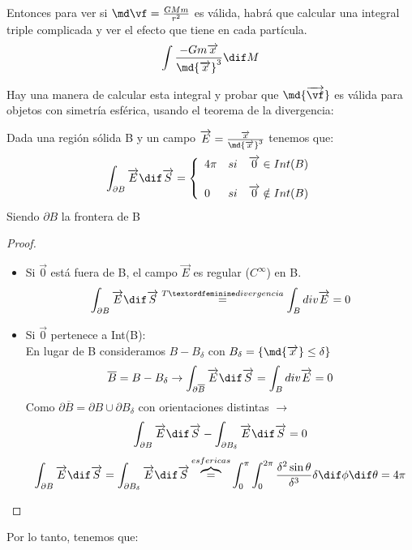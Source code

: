 Entonces para ver si $\md\vf = \frac{GMm}{r^2}$  es válida, habrá que calcular una integral triple complicada y ver el efecto que tiene en cada partícula.
$$\int\frac{-Gm\overrightarrow{x}}{\md {\overrightarrow{x}}^3}\dif M$$

Hay una manera de calcular esta integral y probar que  $\md{\overrightarrow{\vf}}$ es válida para objetos con simetría esférica, usando el teorema de la divergencia:

\begin{prop}
	Dada una región sólida B y un campo $\overrightarrow{E} = \frac{\overrightarrow{x}}{\md {\overrightarrow{x}}^3}$ tenemos que:
	\[\int_{\partial B} \overrightarrow E \dif \overrightarrow S =
	\left\{ \begin{array}{lcc}
	     4\pi & si & \overrightarrow 0 \in Int(B) \\
	  \\ 0 & si & \overrightarrow 0 \notin Int(B)
	\end{array} \right.\]
	Siendo $\partial B$ la frontera de B
\end{prop}
\begin{proof}
	\begin{itemize}
	\item Si $\overrightarrow 0$ está fuera de B, el campo $\overrightarrow E$ es regular ($C^{\infty}$) en B.\\
	$$\int_{\partial B} \overrightarrow E \dif \overrightarrow S \stackrel{Tª divergencia}{=} \int_B div \overrightarrow E = 0$$

	\item Si $\overrightarrow 0$ pertenece a Int(B):\\
	En lugar de B consideramos $B - B_{\delta}$ con $B_{\delta} = \{ \md{\overrightarrow x} \le \delta \} $\\
	$$\overline{B} = B- B_\delta \rightarrow \int_{\partial {\overline{B}}} \overrightarrow E \dif \overrightarrow S = \int_B div \overrightarrow E = 0$$
	Como $\partial{\overline{B}} = \partial B \cup \partial{B_\delta}$ con orientaciones distintas $\rightarrow$ $$ \int_{\partial B} \overrightarrow E \dif \overrightarrow S - \int _{\partial{B_\delta}} \overrightarrow E \dif \overrightarrow S = 0$$
	$$ \int_{\partial B} \overrightarrow E \dif \overrightarrow S = \int _{\partial{B_\delta}} \overrightarrow E \dif \overrightarrow S \overbrace{=}^{esfericas} \int_0^{\pi} \int_0^{2\pi} \frac{\delta ^2 \sin\theta}{\delta ^3} \delta \dif \phi \dif \theta = 4\pi$$
	\end{itemize}
\end{proof}
\newpage
Por lo tanto, tenemos que:

